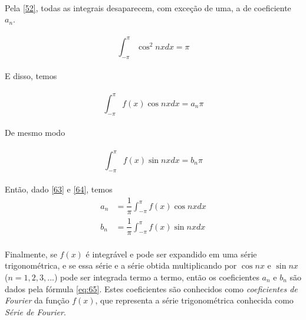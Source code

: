 \\
Pela \ref{52}, todas as integrais desaparecem, com exceção de uma, a de coeficiente $a_n$.\\
\\
\begin{equation}
    \int_{-\pi}^{\pi}\cos^2{nx}dx = \pi
\end{equation}
\\ 
E disso, temos\\
\\
\begin{equation}
\label{63}
    \int_{-\pi}^{\pi}f(x)\cos{nx}dx = a_n\pi
\end{equation}
\\
De mesmo modo\\
\\
\begin{equation}
\label{64}
    \int_{-\pi}^{\pi}f(x)\sin{nx}dx = b_n\pi
\end{equation}
\\
Então, dado \ref{63} e \ref{64}, temos\\
\begin{equation}
\label{eq:65}
    \begin{split}
        a_n &= \dfrac{1}{\pi}\int_{-\pi}^{\pi}f(x)\cos{nx}dx\\
        b_n &= \dfrac{1}{\pi}\int_{-\pi}^{\pi}f(x)\sin{nx}dx
    \end{split}
\end{equation}
\\
Finalmente, se $f(x)$ é integrável e pode ser expandido em uma série trigonométrica,
e se essa série e a série obtida multiplicando por $\cos{nx}$ e $\sin{nx}$ ($n = 1, 2, 3, ...$)
pode ser integrada termo a termo, então os coeficientes $a_n$ e $b_n$ são dados pela
fórmula \ref{eq:65}. Estes coeficientes são conhecidos como \textit{coeficientes de Fourier}
da função $f(x)$, que representa a série trigonométrica conhecida como \textit{Série de
Fourier}.\\